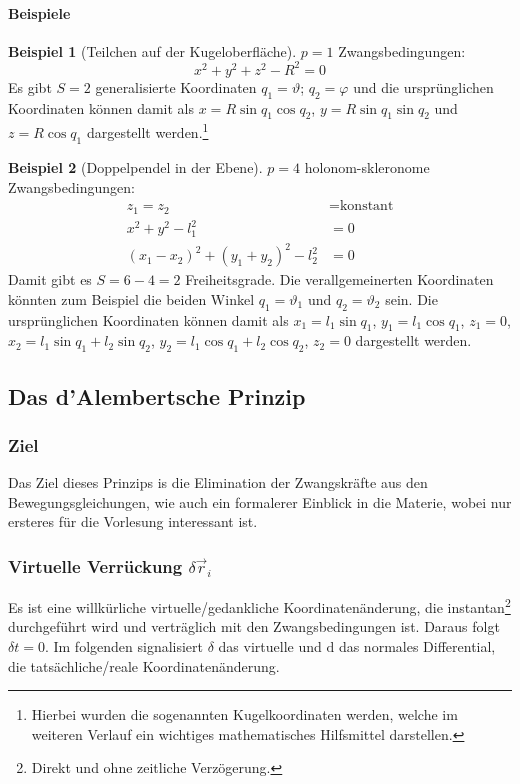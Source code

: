 \documentclass[oneside]{book}
\theoremstyle{definition}
\newtheorem*{beispiel*}{Beispiel}
\newcommand{\conseq}{$\rightarrow$~}
\renewcommand{\d}{\mathrm d}
\begin{document}
\paragraph{Beispiele}

\begin{beispiel*}[Teilchen auf der Kugeloberfläche]
$p = 1$ Zwangsbedingungen:
$$x^2 + y^2 + z^2 - R^2 = 0$$
Es gibt $S = 2$ generalisierte Koordinaten $q_1 = \vartheta$; $q_2 = \varphi$ und die ursprünglichen Koordinaten können damit als $x = R \sin{q_1} \cos{q_2}$, $y = R \sin q_1 \sin q_2$ und $z = R \cos q_1$ dargestellt werden.\footnote{Hierbei wurden die sogenannten Kugelkoordinaten werden, welche im weiteren Verlauf ein wichtiges mathematisches Hilfsmittel darstellen.}
\end{beispiel*}

\begin{beispiel*}[Doppelpendel in der Ebene] $p = 4$ holonom-skleronome Zwangsbedingungen:
\begin{align*}
	z_1 = z_2 &= \text{konstant}\\
	x^2 + y^2 - l^2_1 &= 0\\
	(x_1 - x_2)^2 + (y_1 + y_2)^2 - l_2^2 &= 0 
\end{align*}
Damit gibt es $S = 6 - 4= 2$ Freiheitsgrade. Die verallgemeinerten Koordinaten könnten zum Beispiel die beiden Winkel $q_1 = \vartheta_1$ und $q_2 = \vartheta_2$ sein. Die ursprünglichen Koordinaten können damit als $x_1 = l_1 \sin q_1$, $y_1 = l_1 \cos q_1$, $z_1 = 0$, $x_2 = l_1 \sin q_1 + l_2 \sin q_2$, $y_2 = l_1 \cos q_1 + l_2 \cos q_2$, $z_2 = 0$  dargestellt werden.
\end{beispiel*}


\subsection{Das d'Alembertsche Prinzip}

\subsubsection{Ziel} Das Ziel dieses Prinzips is die Elimination der Zwangskräfte aus den Bewegungsgleichungen, wie auch ein formalerer Einblick in die Materie, wobei nur ersteres für die Vorlesung interessant ist.


\subsubsection{Virtuelle Verrückung $\delta \vec{r}_i$} Es ist eine willkürliche virtuelle/gedankliche Koordinatenänderung, die instantan\footnote{Direkt und ohne zeitliche Verzögerung.} durchgeführt wird und verträglich mit den Zwangsbedingungen ist. Daraus folgt $\delta t = 0$. Im folgenden signalisiert $\delta$ das virtuelle und $\d$ das normales Differential, die tatsächliche/reale Koordinatenänderung.
\end{document}
